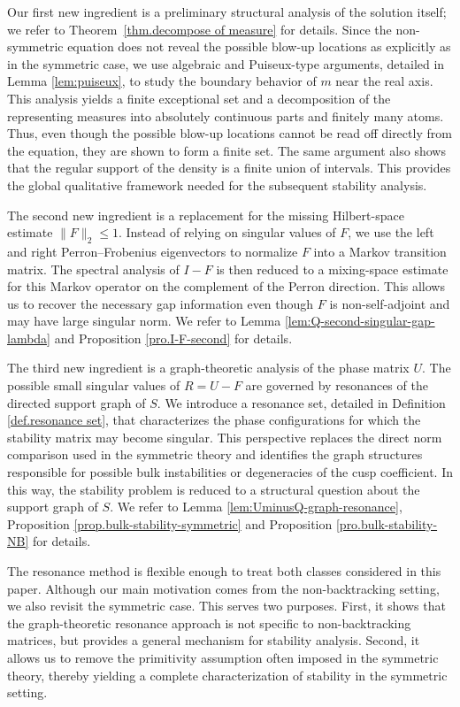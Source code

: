 \documentclass[11pt,twoside, a4paper]{article}
\numberwithin{equation}{section}
\numberwithin{figure}{section}
\theoremstyle{plain} %
\theoremstyle{definition}
\theoremstyle{remark}
\newcommand{\1} {\mspace{1 mu}}
\newcommand{\2} {\mspace{2 mu}}
\begin{document}
Our first new ingredient is a preliminary structural analysis of the
solution itself; we refer to Theorem~\ref{thm.decompose of measure} for details. 
Since the non-symmetric equation does not reveal the
possible blow-up locations as explicitly as in the symmetric case, we use
algebraic and Puiseux-type arguments, detailed in Lemma \ref{lem:puiseux}, to study the boundary behavior of
\(m\) near the real axis. This analysis yields a finite exceptional set
and a decomposition of the representing measures into absolutely
continuous parts and finitely many atoms. Thus, even though the possible
blow-up locations cannot be read off directly from the equation, they are
shown to form a finite set. The same argument also shows that the regular
support of the density is a finite union of intervals. This provides the
global qualitative framework needed for the subsequent stability analysis.

The second new ingredient is a replacement for the missing Hilbert-space
estimate \(\|F\|_2\le 1\). Instead of relying on singular values of \(F\),
we use the left and right Perron--Frobenius eigenvectors to normalize
\(F\) into a Markov transition matrix. The
spectral analysis of \(I-F\) is then reduced to a mixing-space estimate for this
Markov operator on the complement of the Perron direction. This allows us
to recover the necessary gap information even though \(F\) is
non-self-adjoint and may have large singular norm. We refer to Lemma \ref{lem:Q-second-singular-gap-lambda} and Proposition \ref{pro.I-F-second} for details.

The third new ingredient is a graph-theoretic analysis of the phase matrix
\(U\). The possible small singular values of
 $   R=U-F$
are governed by resonances of the directed support graph of \(S\). We
introduce a resonance set, detailed in Definition \ref{def.resonance set}, that characterizes the phase configurations for
which the stability matrix may become singular. This perspective replaces
the direct norm comparison used in the symmetric theory and identifies the
graph structures responsible for possible bulk instabilities or
degeneracies of the cusp coefficient. In this way, the stability problem
is reduced to a structural question about the support graph of \(S\).
We refer to Lemma \ref{lem:UminusQ-graph-resonance}, Proposition \ref{prop.bulk-stability-symmetric} and Proposition \ref{pro.bulk-stability-NB} for details.

The resonance method is flexible enough to treat both classes considered
in this paper. Although our main motivation comes from the
non-backtracking setting, we also revisit the symmetric case. This serves
two purposes. First, it shows that the graph-theoretic resonance approach
is not specific to non-backtracking matrices, but provides a general
mechanism for stability analysis. Second, it allows us to remove the
primitivity assumption often imposed in the symmetric theory, thereby
yielding a complete characterization of stability in the symmetric
setting.
\end{document}
